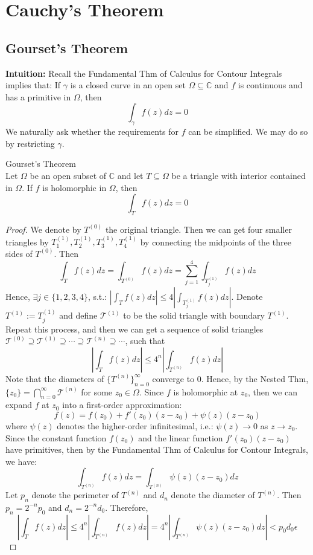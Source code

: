 \chapter{Cauchy's Theorem}

\section{Gourset's Theorem}

\noindent\textbf{Intuition:} Recall the Fundamental Thm of Calculus for Contour Integrals implies that: If $\gamma$ is a closed curve in an open set $\Omega \subseteq \mathbb{C}$ and $f$ is continuous and has a primitive in $\Omega$, then
\[
\int_\gamma f(z)dz= 0
\]
We naturally ask whether the requirements for $f$ can be simplified. We may do so by restricting $\gamma$.

\begin{theorem}{Gourset's Theorem}\\
Let $\Omega$ be an open subset of $\mathbb{C}$ and let $T \subseteq \Omega$ be a triangle with interior contained in $\Omega$. If $f$ is holomorphic in $\Omega$, then
\[
\int_T f(z)dz=0
\]
\end{theorem}

\begin{proof}
    We denote by $T^{(0)}$ the original triangle. Then we can get four smaller triangles by $T_1^{(1)},T_2^{(1)}, T_3^{(1)}, T_4^{(1)}$ by connecting the midpoints of the three sides of $T^{(0)}$. Then
    \[
    \int_Tf(z) dz= \int_{T^{(0)}} f(z)dz= \sum_{j=1}^4 \int_{T_j^{(1)}} f(z)dz
    \]
    Hence, $\exists j\in \{1,2,3,4\}$, s.t.: $|\int_T f(z)dz| \leq 4|\int_{T_j^{(1)}} f(z)dz|$. Denote $T^{(1)}:= T_j^{(1)}$ and define $\mathcal{T}^{(1)}$ to be the solid triangle with boundary $T^{(1)}$. Repeat this process, and then we can get a sequence of solid triangles $\mathcal{T}^{(0)} \supseteq \mathcal{T}^{(1)} \supseteq \cdots \supseteq \mathcal{T}^{(n)} \supseteq \cdots$, such that
    \[
    |\int_T f(z)dz| \leq 4^n|\int_{T^{(n)}} f(z)dz|
    \]
    Note that the diameters of $\{T^{(n)}\}_{n=0}^\infty$ converge to $0$. Hence, by the Nested Thm, $\{z_0 \} =\bigcap_{n=0}^\infty \mathcal{T}^{(n)}$ for some $z_0 \in \Omega$. Since $f$ is holomorphic at $z_0$, then we can expand $f$ at $z_0$ into a first-order approximation:
    \[
    f(z)= f(z_0)+ f'(z_0) (z-z_0)+ \psi(z) (z-z_0)
    \]
    where $\psi(z)$ denotes the higher-order infinitesimal, i.e.: $\psi(z) \to 0$ as $z\to z_0$. Since the constant function $f(z_0)$ and the linear function $f'(z_0) (z-z_0)$ have primitives, then by the Fundamental Thm of Calculus for Contour Integrals, we have:
    \[
    \int_{T^{(n)}} f(z)dz =\int_{T^{(n)}} \psi(z) (z-z_0)dz
    \]
    Let $p_n$ denote the perimeter of $T^{(n)}$ and $d_n$ denote the diameter of $T^{(n)}$. Then $p_n= 2^{-n} p_0$ and $d_n= 2^{-n}d_0$. Therefore, 
    \[
    |\int_Tf(z)dz| \leq 4^n|\int_{T^{(n)}} f(z)dz| =4^n|\int_{T^{(n)}} \psi(z) (z-z_0)dz| < p_0d_0 \epsilon
    \]
\end{proof}


